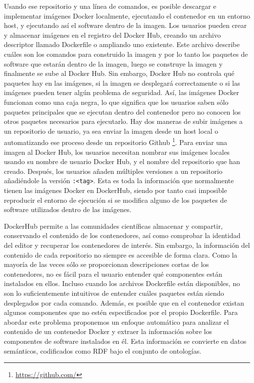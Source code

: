 Usando ese repositorio y una línea de comandos, es posible descargar e implementar imágenes Docker localmente, ejecutando el contenedor en un entorno host, y ejecutando así el software dentro de la imagen. Los usuarios pueden crear y almacenar imágenes en el registro del Docker Hub, creando un archivo descriptor llamado Dockerfile o ampliando uno existente.  Este archivo describe cuáles son los comandos para construido la imagen y por lo tanto los paquetes de software que estarán dentro de la imagen, luego se construye la imagen y finalmente se sube al Docker Hub. Sin embargo, Docker Hub no controla qué paquetes hay en las imágenes, si la imagen se desplegará correctamente o si las imágenes pueden tener algún problema de seguridad. 
Así, las imágenes Docker funcionan como una caja negra, lo que significa que los usuarios saben sólo paquetes principales que se ejecutan dentro del contenedor pero no conocen los otros paquetes necesarios para ejecutarlo.
Hay dos maneras de subir imágenes a un repositorio de usuario, ya sea enviar la imagen desde un host local o automatizando ese proceso desde un repositorio Github \footnote{\url{https://github.com/}}. Para enviar una imagen al Docker Hub, los usuarios necesitan nombrar sus imágenes locales usando su nombre de usuario Docker Hub, y el nombre del repositorio que han creado. 
Después, los usuarios añaden múltiples versiones a un repositorio añadiéndole la versión \texttt{:<tag>}. 
Esta es toda la información que normalmente tienen las imágenes Docker en DockerHub, siendo por tanto casi imposible reproducir el entorno de ejecución si se modifica alguno de los paquetes de software utilizados dentro de las imágenes. 


DockerHub permite a las comunidades científicas almacenar y compartir, conservando el contenido de los contenedores, así como comprobar la identidad del editor y recuperar los contenedores de interés. Sin embargo, la información del contenido de cada repositorio no siempre es accesible de forma clara. 
Como la mayoría de las veces sólo se proporcionan descripciones cortas de los contenedores, no es fácil para el usuario entender qué componentes están instalados en ellos. 
Incluso cuando los archivos Dockerfile están disponibles, no son lo suficientemente intuitivos de entender cuáles paquetes están siendo desplegados por cada comando.
Además, es posible que en el contenedor existan algunos componentes que no estén especificados por el propio Dockerfile. Para abordar este problema proponemos un enfoque automático para analizar el contenido de un contenedor Docker y extraer la información sobre los componentes de software instalados en él. Esta información se convierte en datos semánticos, codificados como RDF bajo el conjunto de ontologías.

